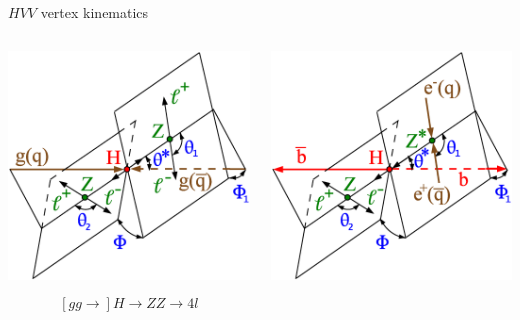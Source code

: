 \documentclass[usenames,dvipsnames,svgnames,table]{beamer}
\begin{document}
\begin{frame}{$HVV$ vertex kinematics}

\begin{columns} \small
\begin{column}{0.33\textwidth} \centering
\includegraphics[width=\columnwidth]{snowmass/angles-HZZ4l} \\
\[\phantom{equation=ghost}\]
\[\left[gg\to\right] H\to ZZ\to 4l\]
\end{column}
\begin{column}{0.33\textwidth} \centering
\includegraphics[width=\columnwidth]{snowmass/angles-ZZHBB} \\

\end{column}
\end{columns}
\end{frame}
\end{document}
